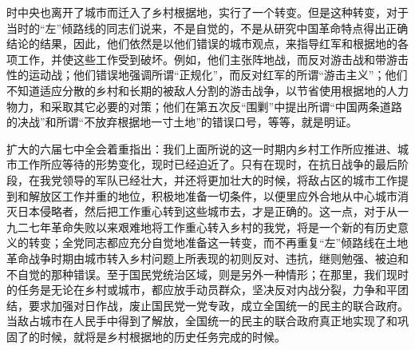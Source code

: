 时中央也离开了城市而迁入了乡村根据地，实行了一个转变。但是这种转变，对于当时的“左”倾路线的同志们说来，不是自觉的，不是从研究中国革命特点得出正确结论的结果，因此，他们依然是以他们错误的城市观点，来指导红军和根据地的各项工作，并使这些工作受到破坏。例如，他们主张阵地战，而反对游击战和带游击性的运动战；他们错误地强调所谓“正规化”，而反对红军的所谓“游击主义”；他们不知道适应分散的乡村和长期的被敌人分割的游击战争，以节省使用根据地的人力物力，和采取其它必要的对策；他们在第五次反“围剿”中提出所谓“中国两条道路的决战”和所谓“不放弃根据地一寸土地”的错误口号，等等，就是明证。

扩大的六届七中全会着重指出：我们上面所说的这一时期内乡村工作所应推进、城市工作所应等待的形势变化，现时已经迫近了。只有在现时，在抗日战争的最后阶段，在我党领导的军队已经壮大，并还将更加壮大的时候，将敌占区的城市工作提到和解放区工作并重的地位，积极地准备一切条件，以便里应外合地从中心城市消灭日本侵略者，然后把工作重心转到这些城市去，才是正确的。这一点，对于从一九二七年革命失败以来艰难地将工作重心转入乡村的我党，将是一个新的有历史意义的转变；全党同志都应充分自觉地准备这一转变，而不再重复“左”倾路线在土地革命战争时期由城市转入乡村问题上所表现的初则反对、违抗，继则勉强、被迫和不自觉的那种错误。至于国民党统治区域，则是另外一种情形；在那里，我们现时的任务是无论在乡村或城市，都应放手动员群众，坚决反对内战分裂，力争和平团结，要求加强对日作战，废止国民党一党专政，成立全国统一的民主的联合政府。当敌占城市在人民手中得到了解放，全国统一的民主的联合政府真正地实现了和巩固了的时候，就将是乡村根据地的历史任务完成的时候。

